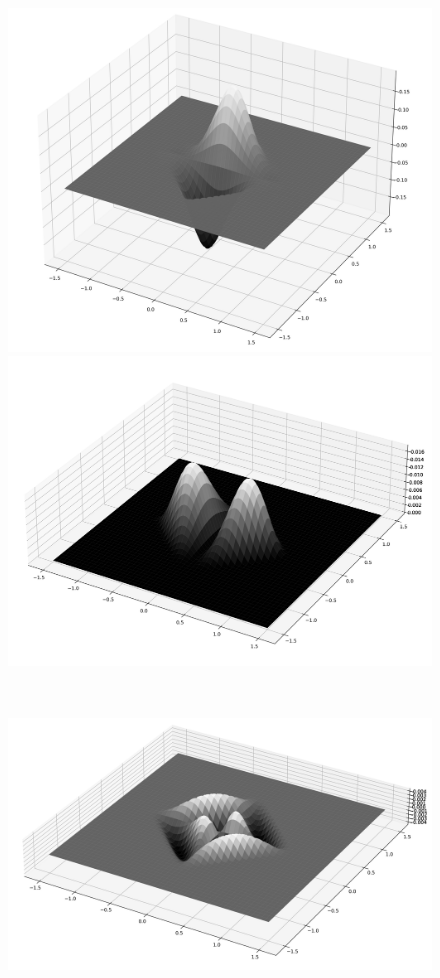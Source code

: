 \documentclass[fleqn, bachelor,subf,12pt,notitlepage]{article}
\begin{document}
\begin{figure}[H]
\begin{minipage}[b]{0.4\textwidth}
    \includegraphics[width=\textwidth]{images/argyris_basis_fy_value}
  \end{minipage}
\hfill
  \begin{minipage}[b]{0.4\textwidth}
    \includegraphics[width=\textwidth]{images/argyris_basis_fxx_value}
  \end{minipage}
\\
  \begin{minipage}[b]{0.4\textwidth}
    \includegraphics[width=\textwidth]{images/argyris_basis_fxy_value}

\end{minipage}
\end{figure}
\end{document}
